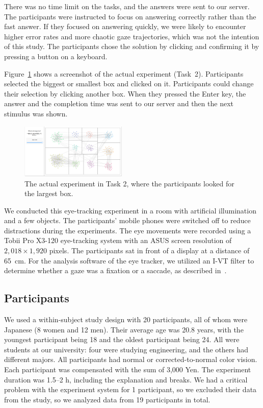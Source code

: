 \documentclass[review]{vgtc}                 %
\begin{document}
There was no time limit on the tasks, and the answers were sent to our server.
The participants were instructed to focus on answering correctly rather than the fast answer.
If they focused on answering quickly, we were likely to encounter higher error rates and more chaotic gaze trajectories, which was not the intention of this study.
The participants chose the solution by clicking and confirming it by pressing a button on a keyboard.

Figure~\ref{screenShot} shows a screenshot of the actual experiment (Task~2). Participants selected the biggest or smallest box and clicked on it. Participants could change their selection by clicking another box. When they pressed the Enter key, the answer and the completion time was sent to our server and then the next stimulus was shown.

\begin{figure}[t]
  \begin{center}
    \includegraphics[width=0.45\textwidth]{pictures/screenshot.png}
    \caption{The actual experiment in Task 2, where the participants looked for the largest box.}
    \label{screenShot}
  \end{center}
\end{figure}

We conducted this eye-tracking experiment in a room with artificial illumination and a few objects.
The participants' mobile phones were switched off to reduce distractions during the experiments.
The eye movements were recorded using a Tobii Pro X3-120 eye-tracking system with an ASUS screen resolution of $2,018 \times 1,920$ pixels.
The participants sat in front of a display at a distance of 65~cm.
For the analysis software of the eye tracker, we utilized an I-VT filter to determine whether a gaze was a fixation or a saccade, as described in~\cite{olsen2012tobii}.

\subsection{Participants}

We used a within-subject study design with 20 participants, all of whom were Japanese (8 women and 12 men).
Their average age was 20.8 years, with the youngest participant being 18 and the oldest participant being 24.
All were students at our university: four were studying engineering, and the others had different majors.
All participants had normal or corrected-to-normal color vision.
Each participant was compensated with the sum of 3,000 Yen.
The experiment duration was 1.5--2 h, including the explanation and breaks.
We had a critical problem with the experiment system for 1 participant, so we excluded their data from the study, so we analyzed data from 19 participants in total.
\end{document}
